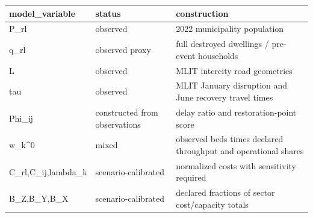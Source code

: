\begin{tabular}{lll}
\toprule
model\_variable & status & construction \\
\midrule
P\_rl & observed & 2022 municipality population \\
q\_rl & observed proxy & full destroyed dwellings / pre-event households \\
L & observed & MLIT intercity road geometries \\
tau & observed & MLIT January disruption and June recovery travel times \\
Phi\_ij & constructed from observations & delay ratio and restoration-point score \\
w\_k\textasciicircum 0 & mixed & observed beds times declared throughput and operational shares \\
C\_rl,C\_ij,lambda\_k & scenario-calibrated & normalized costs with sensitivity required \\
B\_Z,B\_Y,B\_X & scenario-calibrated & declared fractions of sector cost/capacity totals \\
\bottomrule
\end{tabular}

